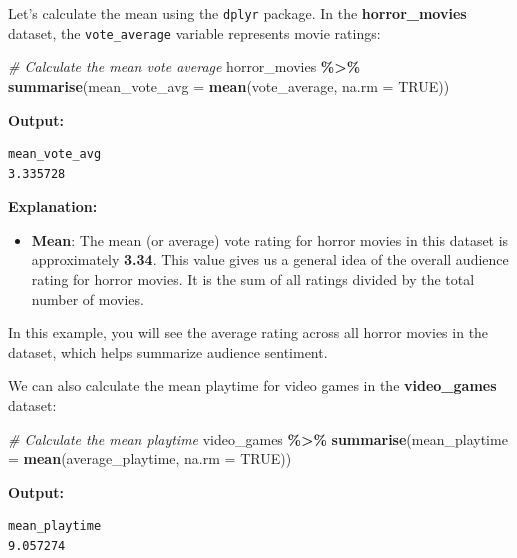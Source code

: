 \documentclass[
]{book}
\newenvironment{Shaded}{\begin{snugshade}}{\end{snugshade}}
\newcommand{\AttributeTok}[1]{\textcolor[rgb]{0.13,0.29,0.53}{#1}}
\newcommand{\CommentTok}[1]{\textcolor[rgb]{0.56,0.35,0.01}{\textit{#1}}}
\newcommand{\ConstantTok}[1]{\textcolor[rgb]{0.56,0.35,0.01}{#1}}
\newcommand{\FunctionTok}[1]{\textcolor[rgb]{0.13,0.29,0.53}{\textbf{#1}}}
\newcommand{\NormalTok}[1]{#1}
\newcommand{\SpecialCharTok}[1]{\textcolor[rgb]{0.81,0.36,0.00}{\textbf{#1}}}
\providecommand{\tightlist}{%
  \setlength{\itemsep}{0pt}\setlength{\parskip}{0pt}}
\begin{document}
Let's calculate the mean using the \texttt{dplyr} package. In the \textbf{horror\_movies} dataset, the \texttt{vote\_average} variable represents movie ratings:

\begin{Shaded}
\begin{Highlighting}[]
\CommentTok{\# Calculate the mean vote average}
\NormalTok{horror\_movies }\SpecialCharTok{\%\textgreater{}\%}
  \FunctionTok{summarise}\NormalTok{(}\AttributeTok{mean\_vote\_avg =} \FunctionTok{mean}\NormalTok{(vote\_average, }\AttributeTok{na.rm =} \ConstantTok{TRUE}\NormalTok{))}
\end{Highlighting}
\end{Shaded}

\textbf{Output:}

\begin{verbatim}
mean_vote_avg
3.335728
\end{verbatim}

\textbf{Explanation:}

\begin{itemize}
\tightlist
\item
  \textbf{Mean}: The mean (or average) vote rating for horror movies in this dataset is approximately \textbf{3.34}. This value gives us a general idea of the overall audience rating for horror movies. It is the sum of all ratings divided by the total number of movies.
\end{itemize}

In this example, you will see the average rating across all horror movies in the dataset, which helps summarize audience sentiment.

We can also calculate the mean playtime for video games in the \textbf{video\_games} dataset:

\begin{Shaded}
\begin{Highlighting}[]
\CommentTok{\# Calculate the mean playtime}
\NormalTok{video\_games }\SpecialCharTok{\%\textgreater{}\%}
  \FunctionTok{summarise}\NormalTok{(}\AttributeTok{mean\_playtime =} \FunctionTok{mean}\NormalTok{(average\_playtime, }\AttributeTok{na.rm =} \ConstantTok{TRUE}\NormalTok{))}
\end{Highlighting}
\end{Shaded}

\textbf{Output:}

\begin{verbatim}
mean_playtime
9.057274
\end{verbatim}
\end{document}
